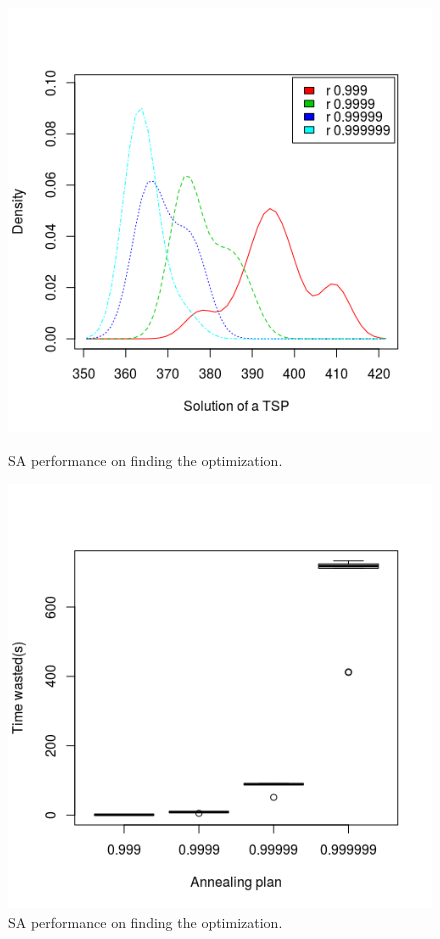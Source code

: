 \documentclass[10.5pt,a4paper]{article}
\begin{document}
\begin{figure}[H]
\begin{minipage}[b]{0.5\linewidth}
\centering
\includegraphics[width=\textwidth]{../result/SAonDiffPlan3.png}
\caption{SA performance on finding the optimization.}
\label{fig:2}
\end{minipage}
\hspace{0.5cm}
\begin{minipage}[b]{0.5\linewidth}
\centering
\includegraphics[width=\textwidth]{../result/SAonDiffPlanTime3.png}
\caption{SA performance on finding the optimization.}
\label{fig:3}
\end{minipage}
\end{figure}
\end{document}
